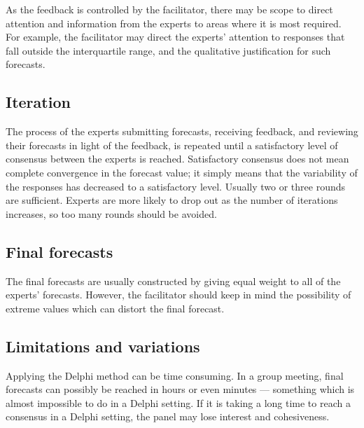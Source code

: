\documentclass[]{book}
\begin{document}
As the feedback is controlled by the facilitator, there may be scope to direct attention and information from the experts to areas where it is most required. For example, the facilitator may direct the experts' attention to responses that fall outside the interquartile range, and the qualitative justification for such forecasts.

\hypertarget{iteration}{%
\subsection*{Iteration}\label{iteration}}

The process of the experts submitting forecasts, receiving feedback, and reviewing their forecasts in light of the feedback, is repeated until a satisfactory level of consensus between the experts is reached. Satisfactory consensus does not mean complete convergence in the forecast value; it simply means that the variability of the responses has decreased to a satisfactory level. Usually two or three rounds are sufficient. Experts are more likely to drop out as the number of iterations increases, so too many rounds should be avoided.

\hypertarget{final-forecasts}{%
\subsection*{Final forecasts}\label{final-forecasts}}

The final forecasts are usually constructed by giving equal weight to all of the experts' forecasts. However, the facilitator should keep in mind the possibility of extreme values which can distort the final forecast.

\hypertarget{limitations-and-variations}{%
\subsection*{Limitations and variations}\label{limitations-and-variations}}

Applying the Delphi method can be time consuming. In a group meeting, final forecasts can possibly be reached in hours or even minutes --- something which is almost impossible to do in a Delphi setting. If it is taking a long time to reach a consensus in a Delphi setting, the panel may lose interest and cohesiveness.
\end{document}
